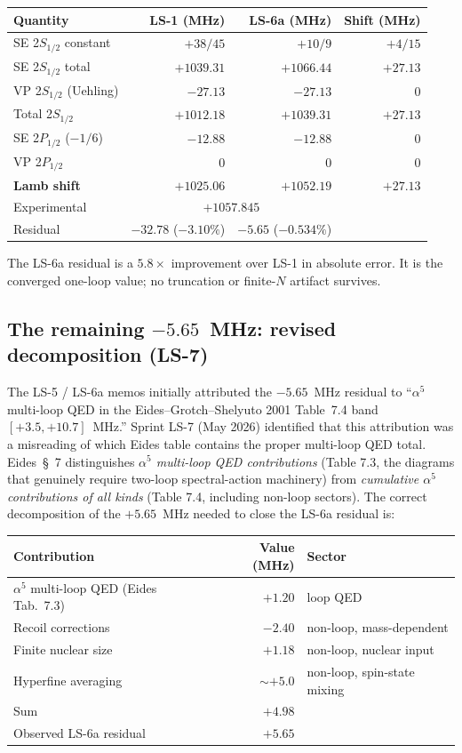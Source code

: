 \documentclass[11pt]{article}
\begin{document}
\begin{center}
\begin{tabular}{l r r r}
\toprule
Quantity & LS-1 (MHz) & LS-6a (MHz) & Shift (MHz) \\
\midrule
SE 2$S_{1/2}$ constant & $+38/45$ & $+10/9$ & $+4/15$ \\
SE 2$S_{1/2}$ total & $+1039.31$ & $+1066.44$ & $+27.13$ \\
VP 2$S_{1/2}$ (Uehling) & $-27.13$ & $-27.13$ & $0$ \\
Total 2$S_{1/2}$ & $+1012.18$ & $+1039.31$ & $+27.13$ \\
SE 2$P_{1/2}$ ($-1/6$) & $-12.88$ & $-12.88$ & $0$ \\
VP 2$P_{1/2}$ & $0$ & $0$ & $0$ \\
\midrule
\textbf{Lamb shift} & \textbf{$+1025.06$} & \textbf{$+1052.19$} & \textbf{$+27.13$} \\
\midrule
Experimental & \multicolumn{2}{c}{$+1057.845$} & \\
Residual & $-32.78$ ($-3.10\%$) & $-5.65$ ($-0.534\%$) & \\
\bottomrule
\end{tabular}
\end{center}

The LS-6a residual is a $5.8\times$ improvement over LS-1 in absolute
error.  It is the converged one-loop value; no truncation or
finite-$N$ artifact survives.

\subsection{The remaining $-5.65$~MHz: revised decomposition (LS-7)}

The LS-5 / LS-6a memos initially attributed the $-5.65$~MHz residual
to ``$\alpha^5$ multi-loop QED in the Eides--Grotch--Shelyuto 2001
Table~7.4 band $[+3.5, +10.7]$~MHz.''  Sprint LS-7 (May 2026)
identified that this attribution was a misreading of which Eides
table contains the proper multi-loop QED total.  Eides~\S~7
distinguishes \emph{$\alpha^5$ multi-loop QED contributions} (Table
7.3, the diagrams that genuinely require two-loop spectral-action
machinery) from \emph{cumulative $\alpha^5$ contributions of all
kinds} (Table 7.4, including non-loop sectors).  The correct
decomposition of the $+5.65$~MHz needed to close the LS-6a residual
is:

\begin{center}
\begin{tabular}{l r l}
\toprule
Contribution & Value (MHz) & Sector \\
\midrule
$\alpha^5$ multi-loop QED (Eides Tab.~7.3) & $+1.20$ & loop QED \\
Recoil corrections & $-2.40$ & non-loop, mass-dependent \\
Finite nuclear size & $+1.18$ & non-loop, nuclear input \\
Hyperfine averaging & $\sim +5.0$ & non-loop, spin-state mixing \\
\midrule
Sum & $+4.98$ & \\
Observed LS-6a residual & $+5.65$ & \\
\bottomrule
\end{tabular}
\end{center}
\end{document}
